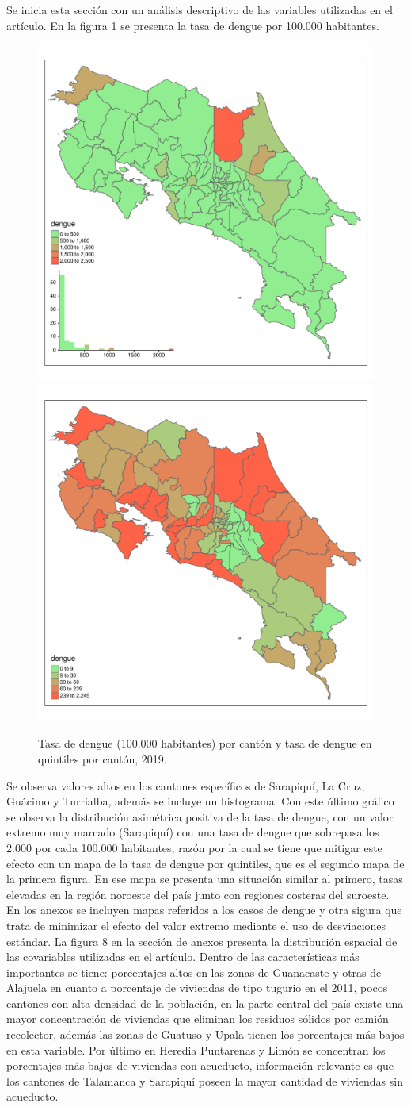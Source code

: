 \documentclass[12pt,a4paper]{article}
\begin{document}
Se inicia esta sección con un análisis descriptivo de las variables utilizadas en el artículo. En la figura 1 se presenta la tasa de dengue por 100.000 habitantes.  
\begin{figure}[h!]
\centering
\includegraphics[width=.48\textwidth]{F11.pdf}
\includegraphics[width=.48\textwidth]{F12.pdf}
\caption{Tasa de dengue (100.000 habitantes) por cantón y tasa de dengue en quintiles por cantón, 2019.}
\end{figure}
\newpage
Se observa valores altos en los cantones específicos de Sarapiquí, La Cruz, Guácimo y Turrialba, además se incluye un histograma. Con este último gráfico se observa la distribución asimétrica positiva de la tasa de dengue, con un valor extremo muy marcado (Sarapiquí) con una tasa de dengue que sobrepasa los 2.000 por cada 100.000 habitantes, razón por la cual se tiene que mitigar este efecto con un mapa de la tasa de dengue por quintiles, que es el segundo mapa de la primera figura. En ese mapa se presenta una situación similar al primero, tasas elevadas en la región noroeste del país junto con regiones costeras del suroeste. En los anexos se incluyen mapas referidos a los casos de dengue y otra sigura que trata de minimizar el efecto del valor extremo mediante el uso de desviaciones estándar.
\newline
La figura 8 en la sección de anexos presenta la distribución espacial de las covariables utilizadas en el artículo. Dentro de las características más importantes se tiene: porcentajes altos en las zonas de Guanacaste y otras de Alajuela en cuanto a porcentaje de viviendas de tipo tugurio en el 2011, pocos cantones con alta densidad de la población, en la parte central del país  existe una mayor concentración de viviendas que eliminan los residuos sólidos por camión recolector, además las zonas de Guatuso y Upala tienen los porcentajes más bajos en esta variable. Por último en Heredia Puntarenas y Limón se concentran los porcentajes más bajos de viviendas con acueducto, información relevante es que los cantones de Talamanca y Sarapiquí poseen la mayor cantidad de viviendas sin acueducto.
\end{document}
